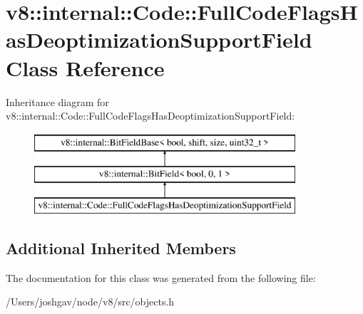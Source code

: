 \hypertarget{classv8_1_1internal_1_1_code_1_1_full_code_flags_has_deoptimization_support_field}{}\section{v8\+:\+:internal\+:\+:Code\+:\+:Full\+Code\+Flags\+Has\+Deoptimization\+Support\+Field Class Reference}
\label{classv8_1_1internal_1_1_code_1_1_full_code_flags_has_deoptimization_support_field}
Inheritance diagram for v8\+:\+:internal\+:\+:Code\+:\+:Full\+Code\+Flags\+Has\+Deoptimization\+Support\+Field\+:\begin{figure}[H]
\begin{center}
\leavevmode
\includegraphics[height=3.000000cm]{classv8_1_1internal_1_1_code_1_1_full_code_flags_has_deoptimization_support_field}
\end{center}
\end{figure}
\subsection*{Additional Inherited Members}


The documentation for this class was generated from the following file\+:\begin{DoxyCompactItemize}
\item 
/\+Users/joshgav/node/v8/src/objects.\+h\end{DoxyCompactItemize}
